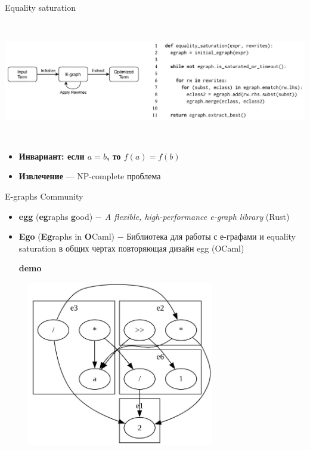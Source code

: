 \documentclass[aspectratio=169
  , xcolor={svgnames}
  , russian  %
  ]{beamer}
\begin{document}
\begin{frame}{Equality saturation}
    \begin{center}
        \includegraphics[width=15.2cm, height=5.2cm]{misc/egraphs_images/equality_saturation1.jpeg}
    \end{center}

    \begin{center}
       \begin{itemize}
           \item \textbf{Инвариант: если $a = b$, то $f(a) = f(b)$} \\
           \item \textbf{Извлечение} --- NP-complete проблема \\
       \end{itemize}


    \end{center}
\end{frame}

\begin{frame}{E-graphs Community}
    \begin{itemize}
        \item \textbf{egg} (\textbf{eg}raphs \textbf{g}ood)\textit{ $-$ A flexible, high-performance e-graph library} (Rust)\newline
        \item \textbf{Ego} (\textbf{Eg}raphs in \textbf{O}Caml) $-$ Библиотека для работы с е-графами и equality saturation в общих чертах повторяющая дизайн egg (OCaml)\newline

        \textbf{demo}

    \end{itemize}
\end{frame}

\begin{frame}{}
    \centering
    \includegraphics[width=10.2cm, height=7.2cm]{misc/egraphs_images/demo_egraph.jpeg}
\end{frame}
\end{document}
